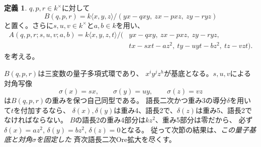 \documentclass[11pt,a4paper]{ltjsarticle}
\theoremstyle{definition}
\newtheorem{definition}[theorem]{定義}
\begin{document}
\begin{definition}\label{diag:def:quantum}
$q,p,r\in k^\times$に対して
\[
B(q,p,r)=k\langle x,y,z\rangle/
(yx-qxy,\ zx-pxz,\ zy-ryz)
\]
と置く。さらに$s,u,v\in k^\times$と$a,b\in k$を用い、
\begin{equation}\label{diag:eq:family}
\begin{split}
A(q,p,r;s,u,v;a,b)=k\langle x,y,z,t\rangle/(&yx-qxy,\ zx-pxz,\ zy-ryz,\\
&tx-sxt-az^2,\ ty-uyt-bz^2,\ tz-vzt).
\end{split}
\end{equation}
を考える。
\end{definition}

$B(q,p,r)$は三変数の量子多項式環であり、
$x^iy^jz^h$が基底となる。$s,u,v$による対角写像
\[\sigma(x)=sx,\qquad \sigma(y)=uy,\qquad \sigma(z)=vz\]
は$B(q,p,r)$の重みを保つ自己同型である。
語長二次かつ重み3の導分$\delta$を用いて$t$を付加するなら、
$\delta(x),\delta(y)$は重み4、語長2で、$\delta(z)$は重み5、語長2でなければならない。
$B$の語長2の重み4部分は$kz^2$、重み5部分は零だから、
必ず$\delta(x)=az^2$, $\delta(y)=bz^2$, $\delta(z)=0$となる。
従って次節の結果は、\emph{この量子基底と対角$\sigma$を固定した}
斉次語長二次Ore拡大を尽くす。
\end{document}
